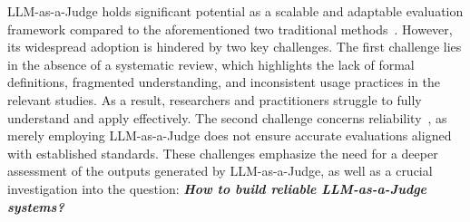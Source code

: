 \documentclass[acmsmall,screen]{acmart}
\newcommand{\jw}[1]{\textcolor{blue}{#1}}
\begin{document}
LLM-as-a-Judge holds significant potential as a scalable and adaptable evaluation framework compared to the aforementioned two traditional methods~\cite{self_taught}. However, its widespread adoption is hindered by two key challenges. The first challenge lies in the absence of a systematic review, which highlights the lack of formal definitions, fragmented understanding, and inconsistent usage practices in the relevant studies. As a result, researchers and practitioners struggle to fully understand and apply effectively. The second challenge concerns reliability~\cite{yu2024xfinder}, as merely employing LLM-as-a-Judge does not ensure accurate evaluations aligned with established standards. 
These challenges emphasize the need for a deeper assessment of the outputs generated by LLM-as-a-Judge, as well as a crucial investigation into the question: \textbf{\textit{How to build reliable LLM-as-a-Judge systems?}}
\end{document}
